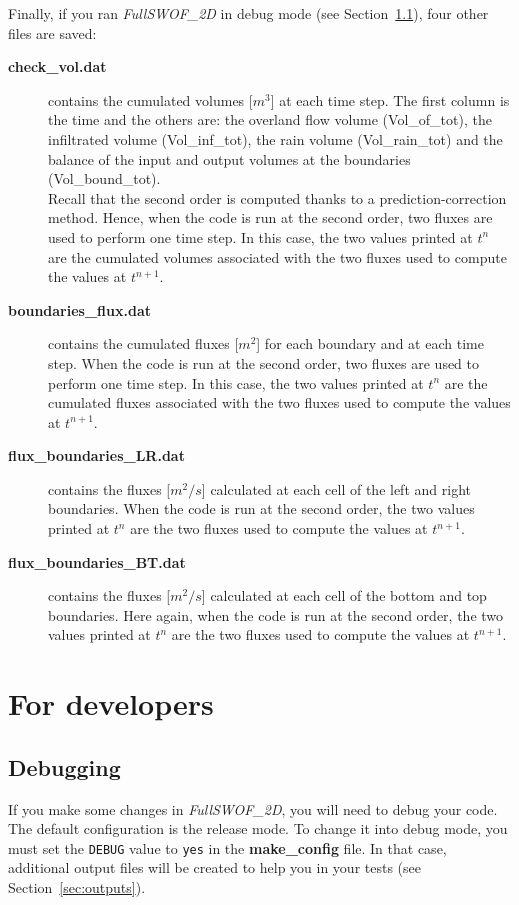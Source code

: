 \documentclass[a4paper, 11pt]{article}
\newcommand{\FullSWOF}{\emph{FullSWOF\_2D}}
\begin{document}
Finally, if you ran \FullSWOF{} in debug mode (see Section~\ref{sec:debug}), four other files are saved:
\begin{description}
	\item[\textbf{check\_vol.dat}] contains the cumulated volumes [$m^3$] at each time step. 
The first column is the time and the others are:
the overland flow volume (Vol\_of\_tot), the infiltrated volume (Vol\_inf\_tot), the rain volume (Vol\_rain\_tot) and the balance of the input and output volumes at the boundaries (Vol\_bound\_tot).\\
Recall that the second order is computed thanks to a prediction-correction method. Hence, when the code is run at the second order, two fluxes are used to perform one time step.
In this case, the two values printed at $t^n$ are the cumulated volumes associated with the two fluxes used to compute the values at $t^{n+1}$.
	\item[\textbf{boundaries\_flux.dat}] contains the cumulated fluxes [$m^2$] for each boundary and at each time step.
When the code is run at the second order, two fluxes are used to perform one time step.
In this case, the two values printed at $t^n$ are the cumulated fluxes associated with the two fluxes used to compute the values at $t^{n+1}$. 
	\item[\textbf{flux\_boundaries\_LR.dat}] contains the fluxes [$m^2/s$] calculated at each cell of the left and right boundaries.
When the code is run at the second order, the two values printed at $t^n$ are the two fluxes used to compute the values at $t^{n+1}$.
	\item[\textbf{flux\_boundaries\_BT.dat}] contains the fluxes [$m^2/s$] calculated at each cell of the bottom and top boundaries. 
Here again, when  the code is run at the second order, the two values printed at $t^n$  are the two fluxes used to compute the values at $t^{n+1}$.
\end{description}

\section{For developers}\label{sec:dvp}

\subsection{Debugging}\label{sec:debug}

If you make some changes in \FullSWOF{}, you will need to debug your code. 
The default configuration is the release mode. To change it into debug mode, you must set the 
\texttt{DEBUG} value to \texttt{yes} in the \textbf{make\_config} file. In that case, additional output
files will be created to help you in your tests (see Section~\ref{sec:outputs}).
\end{document}
